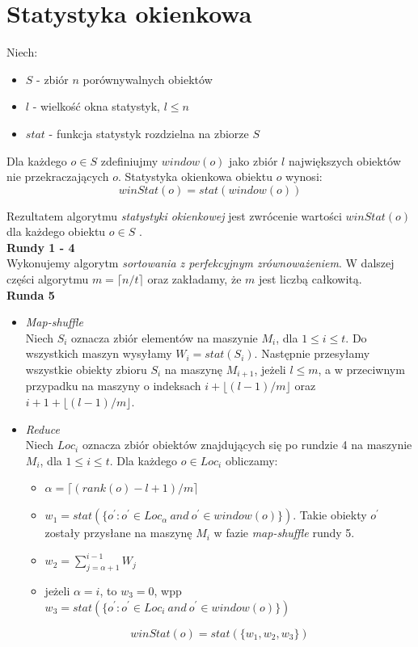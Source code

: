 \documentclass{pracamgr}
\begin{document}
\section{Statystyka okienkowa}
Niech:
\begin{itemize}
    \item \(S\) - zbiór \(n\) porównywalnych obiektów
    \item \(l\) - wielkość okna statystyk, \(l \leq n\)
    \item \(stat\) - funkcja statystyk rozdzielna na zbiorze \(S\)
\end{itemize}

Dla każdego \(o \in S\) zdefiniujmy \(window(o)\) jako zbiór \(l\) największych obiektów nie przekraczających \(o\). Statystyka okienkowa obiektu \(o\) wynosi:
$$winStat(o) = stat(window(o))$$

Rezultatem algorytmu \textit{statystyki okienkowej} jest zwrócenie wartości \(winStat(o)\) dla każdego obiektu \(o \in S\) \cite{tao2013minimal}. \\

\textbf{Rundy 1 - 4} \\
Wykonujemy algorytm \textit{sortowania z perfekcyjnym zrównoważeniem}. W dalszej części algorytmu \(m = \lceil n / t \rceil\) oraz zakładamy, że \(m\) jest liczbą całkowitą. \\

\textbf{Runda 5}
\begin{itemize}
    \item \textit{Map-shuffle} \\
    Niech \(S_i\) oznacza zbiór elementów na maszynie \(M_i\), dla \(1 \leq i \leq t\). Do wszystkich maszyn wysyłamy \(W_i = stat(S_i)\). Następnie przesyłamy wszystkie obiekty zbioru \(S_i\) na maszynę \(M_{i+1}\), jeżeli \(l \leq m\), a w przeciwnym przypadku na maszyny o indeksach \(i + \lfloor (l - 1) / m \rfloor\) oraz \(i+1+\lfloor (l-1)/m \rfloor \).
    
    \item \textit{Reduce} \\
    Niech \(Loc_i\) oznacza zbiór obiektów znajdujących się po rundzie 4 na maszynie \(M_i\), dla \(1 \leq i \leq t\). Dla każdego \(o \in Loc_i\) obliczamy:
    \begin{itemize}
        \item \(\alpha = \lceil (rank(o) - l + 1) / m \rceil\)
        \item \(w_1 = stat(\{o^\prime : o^\prime \in Loc_\alpha \ and \ o^\prime \in window(o)\})\). Takie obiekty \(o^\prime\) zostały przysłane na maszynę \(M_i\) w fazie \textit{map-shuffle} rundy 5.
        \item $w_2 = \sum_{j=\alpha+1}^{i-1} W_j$
        \item jeżeli \(\alpha = i\), to \(w_3 = 0\), wpp \(w_3 = stat(\{o^\prime : o^\prime \in Loc_i \ and \ o^\prime \in window(o)\})\)
    \end{itemize}
    
    $$winStat(o) = stat(\{w_1, w_2, w_3\})$$
\end{itemize}
\end{document}
